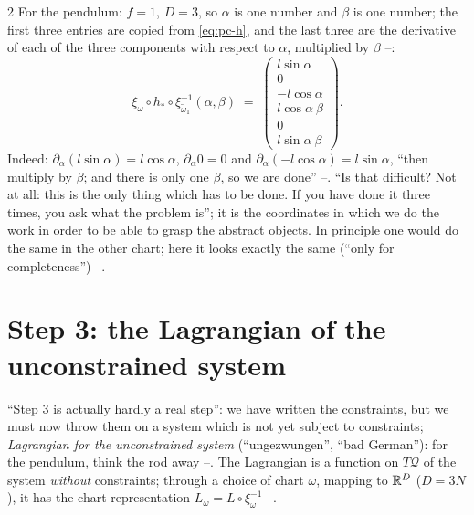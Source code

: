 \begin{paracol}{2}
For the pendulum: $f=1$, $D=3$, so $\alpha$ is one number and $\beta$ is one number; the first three entries are copied from \eqref{eq:pc-h}, and the last three are the derivative of each of the three components with respect to $\alpha$, multiplied by $\beta$ --:
\begin{equation}\label{eq:pc-pushpend}
  \xi_\omega\circ h_*\circ\xi_{\tilde\omega_1}^{-1}(\alpha,\beta)\;=\;\begin{pmatrix}l\sin\alpha\\0\\-l\cos\alpha\\l\cos\alpha\ \beta\\0\\l\sin\alpha\ \beta\end{pmatrix}.
\end{equation}
Indeed: $\partial_\alpha(l\sin\alpha)=l\cos\alpha$, $\partial_\alpha0=0$ and $\partial_\alpha(-l\cos\alpha)=l\sin\alpha$, ``then multiply by $\beta$; and there is only one $\beta$, so we are done'' --. ``Is that difficult? Not at all: this is the only thing which has to be done. If you have done it three times, you ask what the problem is''; it is the coordinates in which we do the work in order to be able to grasp the abstract objects. In principle one would do the same in the other chart; here it looks exactly the same (``only for completeness'') --.

\section{Step 3: the Lagrangian of the unconstrained system}\label{sec:pc-step3}

``Step 3 is actually hardly a real step'': we have written the constraints, but we must now throw them on a system which is not yet subject to constraints; \emph{Lagrangian for the unconstrained system} (``ungezwungen'', ``bad German''): for the pendulum, think the rod away --. The Lagrangian is a function on $T\mathcal Q$ of the system \emph{without} constraints; through a choice of chart $\omega$, mapping to $\mathbb{R}^{D}$ ($D=3N$), it has the chart representation $L_\omega=L\circ\xi_\omega^{-1}$ --.


\end{paracol}
